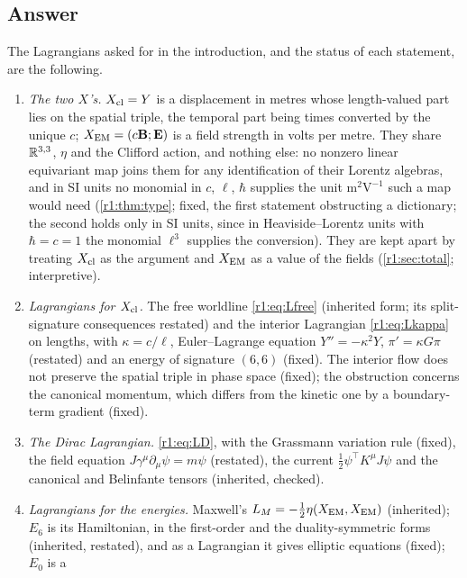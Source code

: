 \subsection{Answer}
\label{r1:sec:answer}

The Lagrangians asked for in the introduction, and the status of each statement, are the following.
\begin{enumerate}[label=(\arabic*),leftmargin=2.2em]
\item \emph{The two $X$'s.} $X_{\rm cl}=Y$ is a displacement in metres whose length-valued part lies on the spatial triple, the temporal
part being times converted by the unique $c$; $X_{\rm EM}=(c\mathbf B;\mathbf E)$ is a field strength in volts per metre. They share $\mathbb{R}^{3,3}$, $\eta$
and the Clifford action, and nothing else: no nonzero linear equivariant map joins them for any identification of their Lorentz algebras,
and in SI units no monomial in $c$, $\ell$, $\hbar$ supplies the unit $\mathrm{m^2V^{-1}}$ such a map would need (\cref{r1:thm:type};
fixed, the first statement obstructing a dictionary; the second holds only in SI units, since in Heaviside--Lorentz units with
$\hbar=c=1$ the monomial $\ell^3$ supplies the conversion). They are kept apart by treating $X_{\rm cl}$ as the argument and $X_{\rm EM}$ as a value of the fields
(\cref{r1:sec:total}; interpretive).
\item \emph{Lagrangians for $X_{\rm cl}$.} The free worldline \eqref{r1:eq:Lfree} (inherited form; its split-signature consequences restated)
and the interior Lagrangian \eqref{r1:eq:Lkappa} on lengths, with $\kappa=c/\ell$, Euler--Lagrange equation $Y''=-\kappa^2Y$, $\pi'=\kappa G\pi$
(restated) and an energy of signature $(6,6)$ (fixed). The interior flow does not preserve the spatial triple in phase
space (fixed); the obstruction concerns the canonical momentum, which differs from the kinetic one by a boundary-term gradient (fixed).
\item \emph{The Dirac Lagrangian.} \eqref{r1:eq:LD}, with the Grassmann variation rule (fixed), the field equation
$J\gamma^\mu\partial_\mu\psi=m\psi$ (restated), the current $\tfrac12\psi^{\!\top}K^\mu J\psi$ and the canonical and Belinfante tensors
(inherited, checked).
\item \emph{Lagrangians for the energies.} Maxwell's $L_M=-\tfrac12\eta(X_{\rm EM},X_{\rm EM})$ (inherited); $E_6$ is its Hamiltonian, in the
first-order and the duality-symmetric forms (inherited, restated), and as a Lagrangian it gives elliptic equations (fixed); $E_0$ is a

\end{enumerate}
